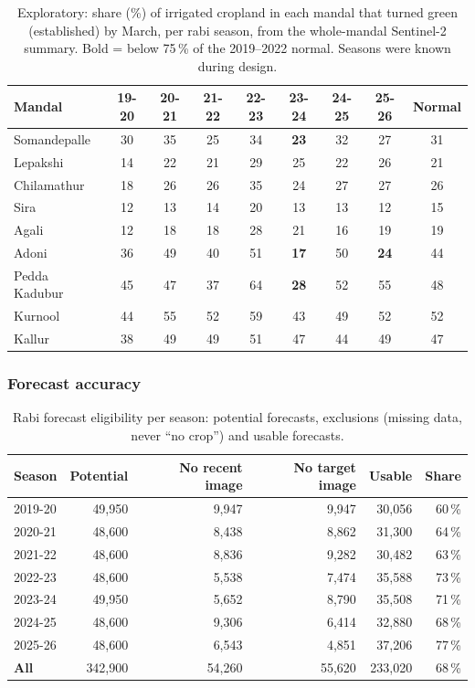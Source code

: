 \documentclass[11pt,a4paper,oneside]{article}
\begin{document}
\begin{table}[H]
\centering
\caption{Exploratory: share (\%) of irrigated cropland in each mandal that turned green (established) by March, per rabi season, from the whole-mandal Sentinel-2 summary. Bold = below 75\,\% of the 2019--2022 normal. Seasons were known during design.}
\label{tab:r_c3}
\footnotesize
\begin{tabular}{@{}lcccccccc@{}}
\toprule
\textbf{Mandal} & \textbf{19-20} & \textbf{20-21} & \textbf{21-22} & \textbf{22-23} & \textbf{23-24} & \textbf{24-25} & \textbf{25-26} & \textbf{Normal} \\
\midrule
Somandepalle & 30 & 35 & 25 & 34 & \textbf{23} & 32 & 27 & 31 \\
Lepakshi & 14 & 22 & 21 & 29 & 25 & 22 & 26 & 21 \\
Chilamathur & 18 & 26 & 26 & 35 & 24 & 27 & 27 & 26 \\
Sira & 12 & 13 & 14 & 20 & 13 & 13 & 12 & 15 \\
Agali & 12 & 18 & 18 & 28 & 21 & 16 & 19 & 19 \\
Adoni & 36 & 49 & 40 & 51 & \textbf{17} & 50 & \textbf{24} & 44 \\
Pedda Kadubur & 45 & 47 & 37 & 64 & \textbf{28} & 52 & 55 & 48 \\
Kurnool & 44 & 55 & 52 & 59 & 43 & 49 & 52 & 52 \\
Kallur & 38 & 49 & 49 & 51 & 47 & 44 & 49 & 47 \\
\bottomrule
\end{tabular}
\end{table}


\subsubsection{Forecast accuracy}
\begin{table}[H]
\centering
\caption{Rabi forecast eligibility per season: potential forecasts, exclusions (missing data, never ``no crop'') and usable forecasts.}
\label{tab:r_elig}
\footnotesize
\begin{tabular}{@{}lrrrrr@{}}
\toprule
\textbf{Season} & \textbf{Potential} & \textbf{No recent image} & \textbf{No target image} & \textbf{Usable} & \textbf{Share} \\
\midrule
2019-20 & 49,950 & 9,947 & 9,947 & 30,056 & 60\,\% \\
2020-21 & 48,600 & 8,438 & 8,862 & 31,300 & 64\,\% \\
2021-22 & 48,600 & 8,836 & 9,282 & 30,482 & 63\,\% \\
2022-23 & 48,600 & 5,538 & 7,474 & 35,588 & 73\,\% \\
2023-24 & 49,950 & 5,652 & 8,790 & 35,508 & 71\,\% \\
2024-25 & 48,600 & 9,306 & 6,414 & 32,880 & 68\,\% \\
2025-26 & 48,600 & 6,543 & 4,851 & 37,206 & 77\,\% \\
\textbf{All} & 342,900 & 54,260 & 55,620 & 233,020 & 68\,\% \\
\bottomrule
\end{tabular}
\end{table}
\end{document}
